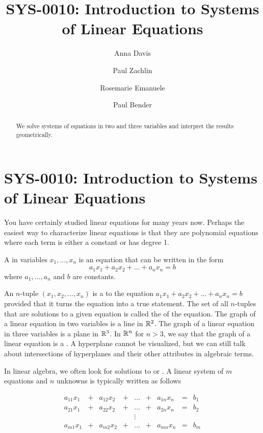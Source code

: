 \documentclass{ximera}
\author{Anna Davis \and Paul Zachlin \and Rosemarie Emanuele \and Paul Bender} \title{SYS-0010:  Introduction to Systems of Linear Equations} \license{CC-BY 4.0}
\begin{document}
\begin{abstract}
 We solve systems of equations in two and three variables and interpret the results geometrically.
\end{abstract}
\maketitle
\section*{SYS-0010:  Introduction to Systems of Linear Equations}
You have certainly studied linear equations for many years now.  Perhaps the easiest way to characterize linear equations is that they are polynomial equations where each term is either a constant or has degree 1.

\begin{definition}\label{def:lineq}
A  in variables $x_1, \ldots, x_n$ is an equation that can be written in the form
$$a_1x_1+a_2x_2+\ldots +a_nx_n=b$$
where $a_1,\ldots ,a_n$ and $b$ are constants.
\end{definition}


An $n$-tuple $(x_1, x_2,\ldots ,x_n)$ is a  to the equation $a_1x_1+a_2x_2+\ldots +a_nx_n=b$ provided that it turns the equation into a true statement.  The set of all $n$-tuples that are solutions to a given equation is called the  of the equation. The graph of a linear equation in two variables is a line in $\mathbb{R}^2$.  The graph of a linear equation in three variables is a plane in $\mathbb{R}^3$.  In $\mathbb{R}^n$ for $n>3$, we say that the graph of a linear equation is a . A hyperplane cannot be visualized, but we can still talk about intersections of hyperplanes and their other attributes in algebraic terms.  

In linear algebra, we often look for solutions to  or .  
A linear system of $m$ equations and $n$ unknowns is typically written as follows

$$\begin{array}{ccccccccc}
      a_{11}x_1 &+ &a_{12}x_2&+&\ldots&+&a_{1n}x_n&= &b_1 \\
	 a_{21}x_1 &+ &a_{22}x_2&+&\ldots&+&a_{2n}x_n&= &b_2 \\
     &&&&\vdots&&&& \\
     a_{m1}x_1 &+ &a_{m2}x_2&+&\ldots&+&a_{mn}x_n&= &b_m
    \end{array}$$
\end{document}
